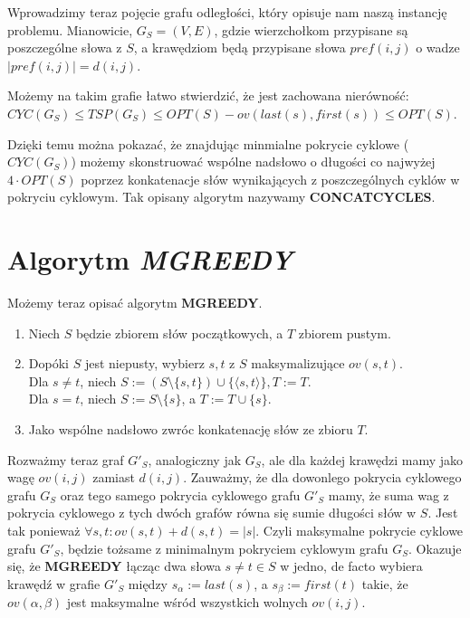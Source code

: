 \documentclass[12pt]{article}
\theoremstyle{definition}
\begin{document}
Wprowadzimy teraz pojęcie grafu odległości, który opisuje nam naszą instancję problemu. Mianowicie,
$G_S = (V,E)$, gdzie wierzchołkom przypisane są poszczególne słowa z $S$, a krawędziom będą przypisane 
słowa $pref(i,j)$ o wadze $|pref(i,j)|=d(i,j)$.

Możemy na takim grafie łatwo stwierdzić, że jest zachowana nierówność: \linebreak
$CYC(G_S) \leq TSP(G_S) \leq OPT(S) - ov(last(s), first(s)) \leq OPT(S)$.

Dzięki temu można pokazać, że znajdując minmialne pokrycie cyklowe ($CYC(G_S)$) możemy skonstruować wspólne nadsłowo o długości co najwyżej $4 \cdot OPT(S)$ poprzez konkatenacje 
słów wynikających z poszczególnych cyklów w pokryciu cyklowym. Tak opisany algorytm nazywamy \textbf{CONCATCYCLES}.
\pagebreak
\section*{Algorytm \textit{\textbf{MGREEDY}}}
Możemy teraz opisać algorytm \textbf{MGREEDY}.
\begin{enumerate}
  \item Niech $S$ będzie zbiorem słów początkowych, a $T$ zbiorem pustym.
  \item Dopóki $S$ jest niepusty, wybierz $s,t$ z $S$ maksymalizujące $ov(s,t)$.\\
  Dla $s\neq t$, niech $S := (S \setminus \{s, t\}) \cup \{\langle s, t \rangle\}, T := T$.\\
  Dla $s = t$, niech $S := S \setminus \{s\}$, a $T := T \cup \{s\}$. 
  \item Jako wspólne nadsłowo zwróc konkatenację słów ze zbioru $T$.
\end{enumerate}

Rozważmy teraz graf $G'_S$, analogiczny jak $G_S$, ale dla każdej krawędzi mamy jako wagę $ov(i,j)$ zamiast $d(i,j)$.
Zauważmy, że dla dowonlego pokrycia cyklowego grafu $G_S$ oraz tego samego pokrycia cyklowego grafu $G'_S$ mamy, że 
suma wag z pokrycia cyklowego z tych dwóch grafów równa się sumie długości słów w $S$. Jest tak ponieważ $\forall s,t: ov(s,t) + d(s,t) =  |s|$. Czyli maksymalne pokrycie cyklowe grafu $G'_S$, będzie tożsame z
minimalnym pokryciem cyklowym grafu $G_S$. Okazuje się, że \textbf{MGREEDY} łącząc dwa słowa $s\neq t \in S$ w jedno, de facto 
wybiera krawędź w grafie $G'_S$ między $s_\alpha := last(s)$, a $s_\beta := first(t)$ takie, że $ov(\alpha, \beta)$ jest maksymalne wśród wszystkich wolnych $ov(i,j)$.
\end{document}
